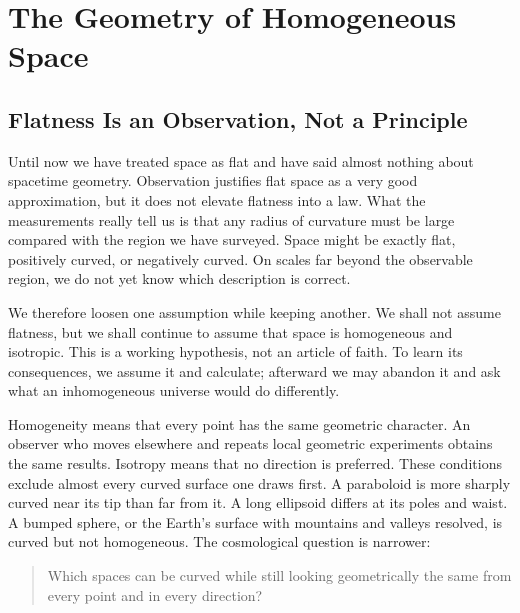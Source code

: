 \chapter{The Geometry of Homogeneous Space}


\section{Flatness Is an Observation, Not a Principle}

Until now we have treated space as flat and have said almost nothing about spacetime geometry. Observation justifies flat space as a very good approximation, but it does not elevate flatness into a law. What the measurements really tell us is that any radius of curvature must be large compared with the region we have surveyed. Space might be exactly flat, positively curved, or negatively curved. On scales far beyond the observable region, we do not yet know which description is correct.

We therefore loosen one assumption while keeping another. We shall not assume flatness, but we shall continue to assume that space is homogeneous and isotropic. This is a working hypothesis, not an article of faith. To learn its consequences, we assume it and calculate; afterward we may abandon it and ask what an inhomogeneous universe would do differently.

Homogeneity means that every point has the same geometric character. An observer who moves elsewhere and repeats local geometric experiments obtains the same results. Isotropy means that no direction is preferred. These conditions exclude almost every curved surface one draws first. A paraboloid is more sharply curved near its tip than far from it. A long ellipsoid differs at its poles and waist. A bumped sphere, or the Earth's surface with mountains and valleys resolved, is curved but not homogeneous. The cosmological question is narrower:
\begin{quote}
Which spaces can be curved while still looking geometrically the same from every point and in every direction?
\end{quote}

